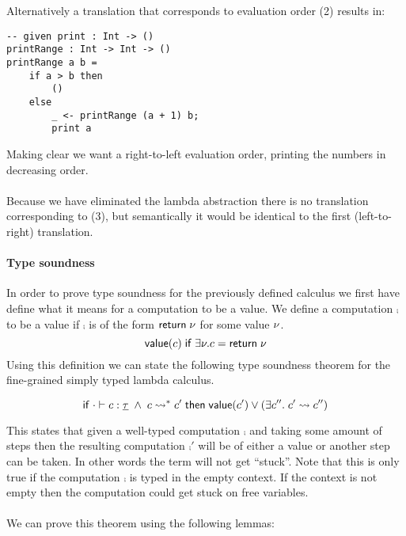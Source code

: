 {\\\\
Alternatively a translation that corresponds to evaluation order (2) results in:
\begin{verbatim}
-- given print : Int -> ()
printRange : Int -> Int -> ()
printRange a b =
	if a > b then
		()
	else
		_ <- printRange (a + 1) b;
		print a
\end{verbatim}
Making clear we want a right-to-left evaluation order, printing the numbers in decreasing order.
\\\\
Because we have eliminated the lambda abstraction there is no translation corresponding to (3), but semantically it would be identical to the first (left-to-right) translation.

\fi

\paragraph{Type soundness}
In order to prove type soundness for the previously defined calculus we first have define what it means for a computation to be a value.
We define a computation $\comp$ to be a value if $\comp$ is of the form $\mathsf{return} \; \nu$ for some value $\nu$.
	\[ \mathsf{value}(c) \;\mathsf{if}\; \exists \nu. c = \mathsf{return} \; \nu \]
Using this definition we can state the following type soundness theorem for the fine-grained simply typed lambda calculus.

\begin{theorem}
\[
	\mathsf{if}\;
		\cdot \vdash c : \underline{\tau}
		\;\land\;
		c \rightsquigarrow^* c'
	\;\mathsf{then}\;
		\mathsf{value}(c')
		\lor
		(\exists c''.\; c' \rightsquigarrow c'')
\]
\end{theorem}

This states that given a well-typed computation $\comp$ and taking some amount of steps then the resulting computation $\comp'$ will be of either a value or another step can be taken.
In other words the term will not get ``stuck''.
Note that this is only true if the computation $\comp$ is typed in the empty context.
If the context is not empty then the computation could get stuck on free variables.
\\\\
We can prove this theorem using the following lemmas:

}
